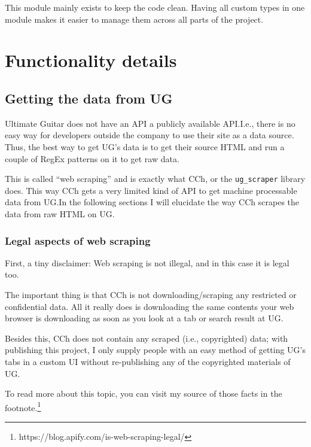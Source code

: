 \documentclass[12pt, a4paper]{article}
\begin{document}
                                This module mainly exists to keep the code clean. Having all custom types in one module makes it easier to manage them across all parts of the project.
                        
        \section{Functionality details}
                \subsection{Getting the data from UG}
                        Ultimate Guitar does not have an API a publicly available API.\@ I.e., there is no easy way for developers outside the company to use their site as a data source. Thus, the best way to get UG's data is to get their source HTML and run a couple of RegEx patterns on it to get raw data.
                        
                        This is called ``web scraping'' and is exactly what CCh, or the \texttt{ug\_scraper} library does. This way CCh gets a very limited kind of API to get machine processable data from UG.\@ In the following sections I will elucidate the way CCh scrapes the data from raw HTML on UG.\@

                        \subsubsection{Legal aspects of web scraping}
                                First, a tiny disclaimer: Web scraping is not illegal, and in this case it is legal too.

                                The important thing is that CCh is not downloading/scraping any restricted or confidential data. All it really does is downloading the same contents your web browser is downloading as soon as you look at a tab or search result at UG.\@

                                Besides this, CCh does not contain any scraped (i.e., copyrighted) data; with publishing this project, I only supply people with an easy method of getting UG's tabs in a custom UI without re-publishing any of the copyrighted materials of UG.\@

                                To read more about this topic, you can visit my source of those facts in the footnote.\footnote{https://blog.apify.com/is-web-scraping-legal/}
\end{document}
